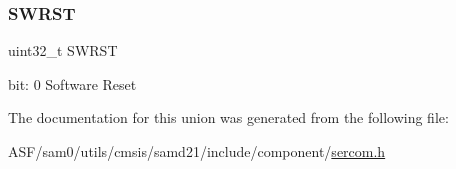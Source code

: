 \subsubsection{\texorpdfstring{SWRST}{SWRST}}
{\footnotesize\ttfamily uint32\+\_\+t S\+W\+R\+ST}

bit\+: 0 Software Reset 

The documentation for this union was generated from the following file\+:\begin{DoxyCompactItemize}
\item 
A\+S\+F/sam0/utils/cmsis/samd21/include/component/\mbox{\hyperlink{utils_2cmsis_2samd21_2include_2component_2sercom_8h}{sercom.\+h}}\end{DoxyCompactItemize}
